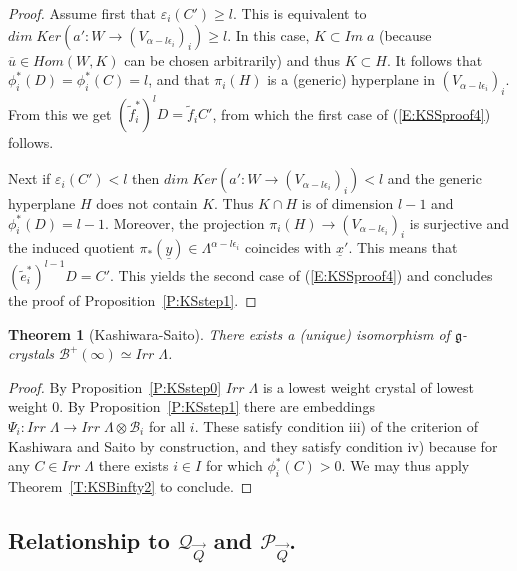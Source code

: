 \documentclass[a4paper,10pt]{amsart}
\def\a{\alpha}
\def\g{\mathfrak{g}}
\def\QQ{\mathcal{Q}_{\vec{Q}}}
\def\PQ{\mathcal{P}_{\vec{Q}}}
\newtheorem{theo}{\bf{Theorem}}[section]
\numberwithin{equation}{section}
\begin{document}
\begin{proof}
Assume first that $\varepsilon_i(C') \geq l$. This is equivalent to $dim\;Ker(a': W \to (V_{\a-l\epsilon_i})_i) \geq l$. In this case, $K \subset Im\;a$ (because $\overline{u} \in Hom(W,K)$ can be chosen arbitrarily) and thus $K \subset H$. It follows that $\phi_i^*(D)=\phi_i^*(C)=l$, and that $\pi_i(H)$ is a (generic) hyperplane in $(V_{\a-l\epsilon_i})_i$. From this we get $(\tilde{f}_i^*)^lD=\tilde{f}_iC'$, from which the first case of (\ref{E:KSSproof4}) follows.

Next if  $\varepsilon_i(C') <l$ then $dim\;Ker(a': W \to (V_{\a-l\epsilon_i})_i) < l$ and the generic hyperplane $H$ does not contain $K$. Thus $K \cap H$ is of dimension $l-1$ and $\phi_i^*(D)=l-1$. Moreover, the projection $\pi_i(H) \to (V_{\a-l\epsilon_i})_i$ is surjective and the induced quotient $\pi_*(\underline{y}) \in \Lambda^{\a-l\epsilon_i}$ coincides with $\underline{x}'$. This means that $(\tilde{e}_i^*)^{l-1}D =C'$. This yields the second case of (\ref{E:KSSproof4}) and concludes the proof of Proposition~\ref{P:KSstep1}.
\end{proof}

\vspace{.1in}

\begin{theo}[Kashiwara-Saito]\label{T:KSMain} There exists a (unique) isomorphism of $\g$-crystals $\mathcal{B}^+(\infty) \simeq Irr\;\Lambda$.
\end{theo}
\begin{proof} By Proposition~\ref{P:KSstep0} $Irr\;\Lambda$ is a lowest weight crystal of lowest weight $0$. By Proposition~\ref{P:KSstep1} there are embeddings $\Psi_i:Irr\;\Lambda \to Irr\;\Lambda \otimes \mathcal{B}_i$ for all $i$. These satisfy condition iii) of  the criterion of Kashiwara and Saito by construction, and they satisfy condition iv) because for any $C \in Irr\;\Lambda$ there exists $i \in I$ for which $\phi^*_i(C) >0$. We may thus apply Theorem~\ref{T:KSBinfty2} to conclude.
\end{proof}


\vspace{.3in}

\subsection{Relationship to $\QQ$ and $\PQ$.}
\end{document}
